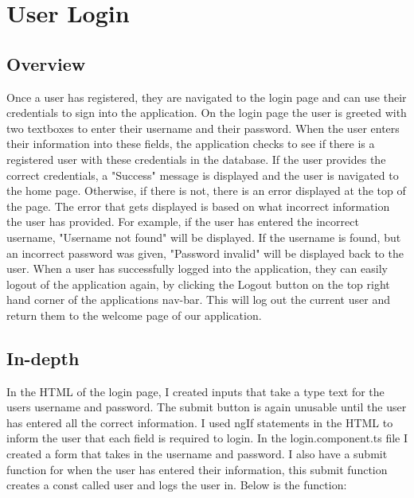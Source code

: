 \section{User Login}

\subsection{Overview}
Once a user has registered, they are navigated to the login page and can use their credentials to sign into the application. On the login page the user is greeted with two textboxes to enter their username and their password. When the user enters their information into these fields, the application checks to see if there is a registered user with these credentials in the database. If the user provides the correct credentials, a "Success" message is displayed and the user is navigated to the home page. Otherwise, if there is not, there is an error displayed at the top of the page. The error that gets displayed is based on what incorrect information the user has provided. For example, if the user has entered the incorrect username, "Username not found" will be displayed. If the username is found, but an incorrect password was given, "Password invalid" will be displayed back to the user. When a user has successfully logged into the application, they can easily logout of the application again, by clicking the Logout button on the top right hand corner of the applications nav-bar. This will log out the current user and return them to the welcome page of our application.

\subsection{In-depth}
In the HTML of the login page, I created inputs that take a type text for the users username and password. The submit button is again unusable until the user has entered all the correct information. I used ngIf statements in the HTML to inform the user that each field is required to login. In the login.component.ts file I created a form that takes in the username and password. I also have a submit function for when the user has entered their information, this submit function creates a const called user and logs the user in. Below is the function:


